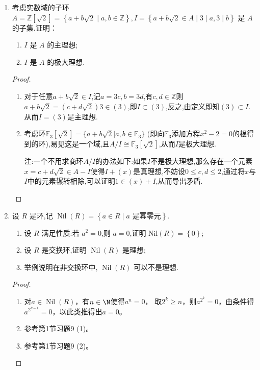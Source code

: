 \begin{enumerate}
\item 考虑实数域的子环 $A = \mathbb{Z}[\sqrt{2}] = \left\{a + b\sqrt{2} \mid a, b \in \mathbb{Z}\right\}, I = \left\{a + b\sqrt{2} \in A \mid 3 \mid a, 3 \mid b\right\}$ 是 $A$ 的子集.证明：
\begin{enumerate}[label=(\arabic*)]
    \item $I$ 是 $A$ 的主理想;
    \item $I$ 是 $A$ 的极大理想.
\end{enumerate}
\begin{proof}
    \begin{enumerate}[label=(\arabic*)]
        \item 对于任意$a+b\sqrt{2}\in I$,记$a=3c,b=3d$,有$c,d\in\mathbb{Z}$则$a+b\sqrt{2}=(c+d\sqrt{2})3\in(3)$,即$I\subset(3)$,反之,由定义即知$(3)\subset I$.从而$I=(3)$是主理想.
        \item 考虑环$\mathbb{F}_3[\sqrt{2}]=\{a+b\sqrt{2}|a,b\in\mathbb{F}_3\}$ (即向$\mathbb{F}_3$添加方程$x^2-2=0$的根得到的环),易见这是一个域,且$A/I\cong \mathbb{F}_3[\sqrt{2}]$,从而$I$是极大理想.
        
              注:一个不用求商环$A/I$的办法如下:如果$I$不是极大理想,那么存在一个元素$x=c+d\sqrt{2}\in A-I$使得$I+(x)$是真理想,不妨设$0\leqslant c,d\leqslant2$,通过将$x$与$I$中的元素辗转相除,可以证明$1\in(x)+I$,从而导出矛盾.\qedhere
    \end{enumerate}
\end{proof}

\item 设 $R$ 是环,记 $\operatorname{Nil}(R) = \left\{a \in R \mid a \text{ 是幂零元}\right\}$.
\begin{enumerate}[label=(\arabic*)]
    \item 设 $R$ 满足性质:若 $a^2 = 0$,则 $a = 0$,证明 $\mathrm{Nil}(R) = \left\{0\right\}$;
    \item 设 $R$ 是交换环,证明 $\operatorname{Nil}(R)$ 是理想;
    \item 举例说明在非交换环中, $\operatorname{Nil}(R)$ 可以不是理想.
\end{enumerate}
\begin{proof}
    \begin{enumerate}[label=(\arabic*)]
    \item 对$a\in\operatorname{Nil}(R)$，有$n\in\N$使得$a^n=0$，
    取$2^k \geqslant n$，则$a^{2^k}=0$，由条件得$a^{2^{k-1}}=0$，以此类推得出$a=0$。
    \item 参考第1节习题9 (1)。
    \item 参考第1节习题9 (2)。\qedhere
    \end{enumerate}
\end{proof}


\end{enumerate}
